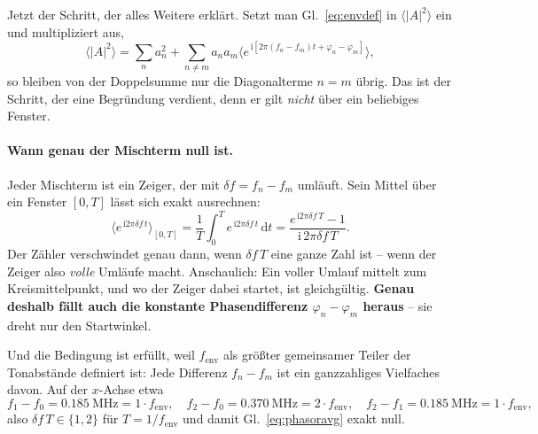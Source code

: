 \documentclass[11pt,a4paper]{article}
\begin{document}
Jetzt der Schritt, der alles Weitere erklärt. Setzt man Gl.~\eqref{eq:envdef}
in $\langle|A|^2\rangle$ ein und multipliziert aus,
\begin{equation}
  \bigl\langle |A|^2 \bigr\rangle
  = \sum_n a_n^2
  + \sum_{n\neq m} a_n a_m
    \bigl\langle e^{\,\mathrm{i}\left[2\pi(f_n-f_m)t+\varphi_n-\varphi_m\right]}\bigr\rangle ,
\end{equation}
so bleiben von der Doppelsumme nur die Diagonalterme $n=m$ übrig. Das ist
der Schritt, der eine Begründung verdient, denn er gilt \emph{nicht} über ein
beliebiges Fenster.

\paragraph{Wann genau der Mischterm null ist.}
Jeder Mischterm ist ein Zeiger, der mit $\delta\! f = f_n-f_m$ umläuft. Sein
Mittel über ein Fenster $[0,T]$ lässt sich exakt ausrechnen:
\begin{equation}
  \bigl\langle e^{\,\mathrm{i}2\pi \delta\! f\, t}\bigr\rangle_{[0,T]}
  = \frac{1}{T}\int_0^{T} e^{\,\mathrm{i}2\pi \delta\! f\, t}\,\mathrm{d}t
  = \frac{e^{\,\mathrm{i}2\pi \delta\! f\, T}-1}{\mathrm{i}\,2\pi \delta\! f\, T} .
  \label{eq:phasoravg}
\end{equation}
Der Zähler verschwindet genau dann, wenn $\delta\! f\,T$ eine ganze Zahl ist
-- wenn der Zeiger also \emph{volle} Umläufe macht. Anschaulich: Ein voller
Umlauf mittelt zum Kreismittelpunkt, und wo der Zeiger dabei startet, ist
gleichgültig. \textbf{Genau deshalb fällt auch die konstante Phasendifferenz
$\varphi_n-\varphi_m$ heraus} -- sie dreht nur den Startwinkel.

Und die Bedingung ist erfüllt, weil $f_\mathrm{env}$ als größter gemeinsamer
Teiler der Tonabstände definiert ist: Jede Differenz $f_n-f_m$ ist ein
ganzzahliges Vielfaches davon. Auf der $x$-Achse etwa
\begin{equation}
  f_1-f_0 = \SI{0.185}{\mega\hertz} = 1\cdot f_\mathrm{env},\quad
  f_2-f_0 = \SI{0.370}{\mega\hertz} = 2\cdot f_\mathrm{env},\quad
  f_2-f_1 = \SI{0.185}{\mega\hertz} = 1\cdot f_\mathrm{env},
\end{equation}
also $\delta\! f\,T \in \{1,2\}$ für $T=1/f_\mathrm{env}$ und damit
Gl.~\eqref{eq:phasoravg} exakt null.
\end{document}
